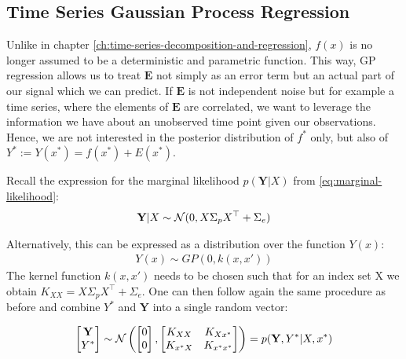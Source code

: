 \subsection{Time Series Gaussian Process Regression}

Unlike in chapter \ref{ch:time-series-decomposition-and-regression}, $f(x)$ is no longer assumed to be a
deterministic and parametric function.
This way, GP regression allows us to treat $\mathbf{E}$ not simply as an error
term but an actual part of our signal which we can predict. If $\mathbf{E}$ is not independent noise but for example a
time series, where the elements of $\mathbf{E}$ are correlated, we want to leverage the information we have about an
unobserved time point given our observations.
Hence, we are not interested in the posterior distribution of $f^{\ast}$ only, but also of
$Y^{\ast} := Y(x^{\ast}) = f(x^{\ast}) + E(x^{\ast})$.

Recall the expression for the marginal likelihood $p(\mathbf{Y}| X)$ from \ref{eq:marginal-likelihood}:
\begin{gather*}
    \mathbf{Y}|X \sim \operatorname{\mathcal{N}}(0,  X \Sigma_p X^{\top} + \Sigma_e) \\
\end{gather*}

Alternatively, this can be expressed as a distribution over the function $Y(x)$:
\begin{gather*}
    Y(x) \sim GP(0, k(x, x'))
\end{gather*}
The kernel function $k(x,x')$ needs to be chosen such that for an index set X we obtain $K_{XX} =  X \Sigma_p X^{\top} + \Sigma_e$.
One can then follow again the same procedure as before and combine $Y^{\ast}$ and $\mathbf{Y}$ into a single random vector:

\begin{gather}
    \begin{bmatrix}
        \mathbf{Y} \\
        Y^{\ast}
    \end{bmatrix}
    \sim \operatorname{\mathcal{N}} \left(
        \begin{bmatrix}
        0 \\
        0
        \end{bmatrix},
        \begin{bmatrix}
        K_{XX} & K_{Xx^{\ast}} \\
        K_{x^{\ast}X} & K_{x^{\ast}x^{\ast}}
        \end{bmatrix}
        \right)
    = p(\mathbf{Y}, Y^{\ast}| X, x^{\ast})
\end{gather}

